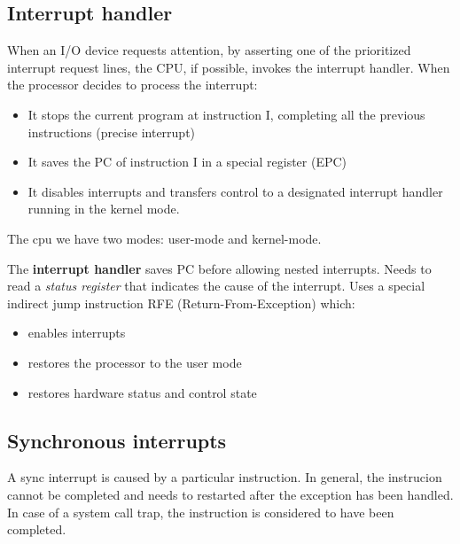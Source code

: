 \subsection{Interrupt handler}\label{subsec:interrupt-handler}
When an I/O device requests attention, by asserting one of the prioritized interrupt request lines, the CPU, if
possible, invokes the interrupt handler.
When the processor decides to process the interrupt:
\begin{itemize}[noitemsep]
    \item It stops the current program at instruction I, completing all the previous instructions (precise interrupt)
    \item It saves the PC of instruction I in a special register (EPC)
    \item It disables interrupts and transfers control to a designated interrupt handler running in the kernel mode.
\end{itemize}
The cpu we have two modes: user-mode and kernel-mode.

The \textbf{interrupt handler} saves PC before allowing nested interrupts.
Needs to read a \textit{status register} that indicates the cause of the interrupt.
Uses a special indirect jump instruction RFE
(Return-From-Exception) which:
\begin{itemize}[noitemsep]
    \item enables interrupts
    \item restores the processor to the user mode
    \item restores hardware status and control state
\end{itemize}

\subsection{Synchronous interrupts}\label{subsec:synchronous-interrupts}
A sync interrupt is caused by a particular instruction.
In general, the instrucion cannot be completed and needs to restarted after the exception has been handled.
In case of a system call trap, the instruction is considered to have been completed.

